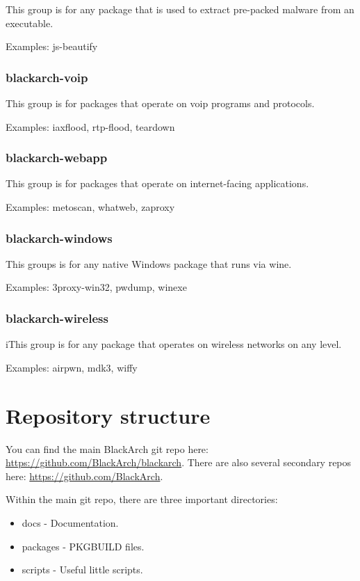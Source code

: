 \documentclass[a4paper, oneside, 11pt]{book}
\begin{document}
This group is for any package that is used to extract pre-packed malware from an executable.

Examples: js-beautify

\subsubsection{blackarch-voip}

This group is for packages that operate on voip programs and protocols.

Examples: iaxflood, rtp-flood, teardown

\subsubsection{blackarch-webapp}

This group is for packages that operate on internet-facing applications.

Examples: metoscan, whatweb, zaproxy

\subsubsection{blackarch-windows}

This groups is for any native Windows package that runs via wine.

Examples: 3proxy-win32, pwdump, winexe

\subsubsection{blackarch-wireless}

iThis group is for any package that operates on wireless networks on any level.

Examples: airpwn, mdk3, wiffy

\section{Repository structure}

You can find the main BlackArch git repo here:
\href{https://github.com/BlackArch/blackarch}{https://github.com/BlackArch/blackarch}. There are
also several secondary repos here:
\href{https://github.com/BlackArch}{https://github.com/BlackArch}.

Within the main git repo, there are three important directories:

\begin{itemize}
	\item docs - Documentation.
	\item packages - PKGBUILD files.
	\item scripts - Useful little scripts.
\end{itemize}
\end{document}
